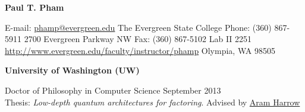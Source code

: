 \documentclass[letter]{article}
\begin{document}
\thispagestyle{firststyle} %

\reversemarginpar		%

{\LARGE {\bf Paul T. Pham}}
\par
\vspace{.25in}
E-mail: \href{mailto:phamp@evergreen.edu}{phamp@evergreen.edu}
\hspace*{\fill}
The Evergreen State College
\linebreak
Phone: (360) 867-5911
\hspace*{\fill}
2700 Evergreen Parkway NW
\linebreak
Fax: (360) 867-5102
\hspace*{\fill}
Lab II 2251
\linebreak
\url{http://www.evergreen.edu/faculty/instructor/phamp}
\hspace*{\fill}
Olympia, WA 98505

\par
\vspace{.25in}



{\bf University of Washington (UW)}
\par
Doctor of Philosophy in Computer Science \hspace*{\fill}September 2013\\
Thesis: \emph{Low-depth quantum architectures for factoring}.
Advised by \href{http://www.cs.washington.edu/people/faculty/aram/}{Aram Harrow}
\vspace{\baselineskip}
\par
\end{document}

